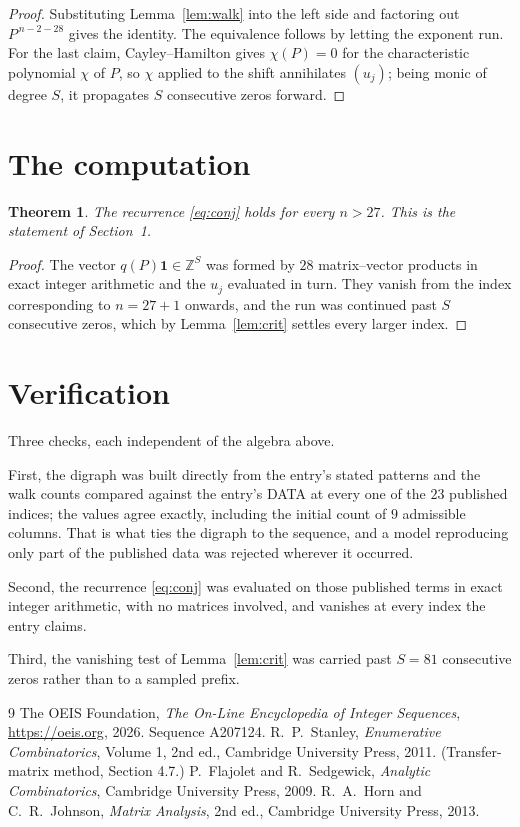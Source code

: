 \documentclass[11pt,a4paper]{article}
\theoremstyle{plain}
\newtheorem{theorem}{Theorem}
\theoremstyle{definition}
\begin{document}
\begin{proof}
Substituting Lemma~\ref{lem:walk} into the left side and factoring out
$P^{\,n-2-28}$ gives the identity. The equivalence follows by letting the exponent
run. For the last claim, Cayley--Hamilton gives $\chi(P)=0$ for the characteristic
polynomial $\chi$ of $P$, so $\chi$ applied to the shift annihilates $(u_j)$; being monic of
degree $S$, it propagates $S$ consecutive zeros forward.
\end{proof}

\section{The computation}

\begin{theorem}
The recurrence \eqref{eq:conj} holds for every $n>27$. This is the statement of
Section~1.
\end{theorem}

\begin{proof}
The vector $q(P)\mathbf{1}\in\mathbb{Z}^{S}$ was formed by $28$ matrix--vector
products in exact integer arithmetic and the $u_j$ evaluated in turn. They vanish from the
index corresponding to $n=27+1$ onwards, and the run was continued past $S$ consecutive
zeros, which by Lemma~\ref{lem:crit} settles every larger index.
\end{proof}

\section{Verification}

Three checks, each independent of the algebra above.

First, the digraph was built directly from the entry's stated patterns and the walk counts
compared against the entry's DATA at every one of the $23$ published indices; the
values agree exactly, including the initial count of $9$ admissible columns. That is
what ties the digraph to the sequence, and a model reproducing only part of the published
data was rejected wherever it occurred.

Second, the recurrence \eqref{eq:conj} was evaluated on those published terms in exact
integer arithmetic, with no matrices involved, and vanishes at every index the entry claims.

Third, the vanishing test of Lemma~\ref{lem:crit} was carried past $S=81$ consecutive
zeros rather than to a sampled prefix.

\begin{thebibliography}{9}
 The OEIS Foundation, \emph{The On-Line Encyclopedia of Integer
Sequences}, \url{https://oeis.org}, 2026. Sequence A207124.
 R.~P.~Stanley, \emph{Enumerative Combinatorics}, Volume 1, 2nd ed.,
Cambridge University Press, 2011. (Transfer-matrix method, Section 4.7.)
 P.~Flajolet and R.~Sedgewick, \emph{Analytic Combinatorics}, Cambridge
University Press, 2009.
 R.~A.~Horn and C.~R.~Johnson, \emph{Matrix Analysis}, 2nd ed., Cambridge
University Press, 2013.
\end{thebibliography}
\end{document}
